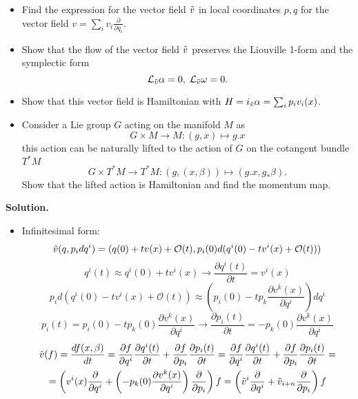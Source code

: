 \documentclass[12pt]{article}
\theoremstyle{definition}
\begin{document}
\begin{enumerate}
    \begin{itemize}
        \item Find the expression for the vector field $\Tilde{v}$ in local coordinates $p, q$ for the vector field $v =\sum_{i}\limits v_i\frac{\partial}{\partial q_i}.$
        \item Show that the flow of the vector field $\Tilde{v}$ preserves the Liouville 1-form and the symplectic form
        \[\mathcal{L}_{\Tilde{v}}\alpha = 0,\;\mathcal{L}_{\Tilde{v}}\omega= 0.\]
        \item Show that this vector field is Hamiltonian with $H=i_{\Tilde{v}} \alpha=\sum_{i}p_iv_i(x)$.
        \item Consider a Lie group $G$ acting on the manifold $M$ as
        \[G\times M \rightarrow M: (g, x) \mapsto  g.x\]
        this action can be naturally lifted to the action of $G$ on the cotangent bundle $T^*M$
        \[G \times T^*M \rightarrow T^*M: (g,(x,\beta)) \mapsto (g.x, g_*\beta).\]
        Show that the lifted action is Hamiltonian and find the momentum map.
    \end{itemize}
    \textbf{Solution.}
    \begin{itemize}
        \item Infinitesimal form:
        \begin{equation}
            \Tilde{v}(q,p_idq^i)=(q(0)+t v(x)+\mathcal{O}(t), p_i(0) d(q^i(0)-tv^i(x)+\mathcal{O}(t)))
        \end{equation}
        \begin{equation}
            q^i(t)\approx q^i(0)+tv^i(x) \rightarrow \frac{\partial q^i(t)}{\partial t}=v^i(x)
        \end{equation}
        \begin{equation}
            p_i d\left(q^i(0)-tv^i(x)+\mathcal{O}(t)\right)\approx \left(p_i(0)-t p_k\frac{\partial v^k(x)}{\partial q^i}\right) dq^i
        \end{equation}
        \begin{equation}
            p_i(t)=p_i(0)-t p_k(0)\frac{\partial v^k(x)}{\partial q^i}\rightarrow \frac{\partial p_i(t)}{\partial t}=-p_k(0)\frac{\partial v^k(x)}{\partial q^i}
        \end{equation}
        \begin{multline}
            \Tilde{v} (f)=\frac{df(x,\beta)}{dt}=\frac{\partial f}{\partial q^i}\frac{\partial q^i(t)}{\partial t}+\frac{\partial f}{\partial p_i}\frac{\partial p_i(t)}{\partial t}=\frac{\partial f}{\partial q^i}\frac{\partial q^i(t)}{\partial t}+\frac{\partial f}{\partial p_i}\frac{\partial p_i(t)}{\partial t}=\\=\left(v^i(x)\frac{\partial}{\partial q^i}+\left(-p_k(0)\frac{\partial v^k(x)}{\partial q^i}\right)\frac{\partial}{\partial p_i}\right)f=\left(\Tilde{v}^i\frac{\partial}{\partial q^i}+\Tilde{v}_{i+n}\frac{\partial}{\partial p_i}\right)f

\end{multline}
\end{itemize}
\end{enumerate}
\end{document}
